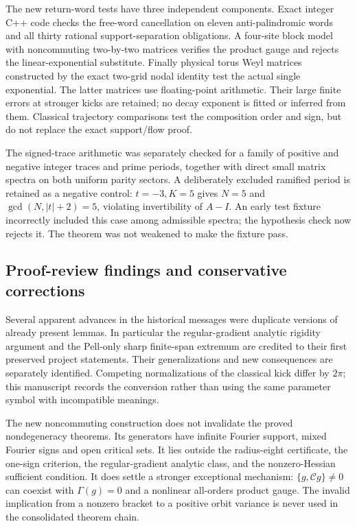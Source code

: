 The new return-word tests have three independent components. Exact integer
C++ code checks the free-word cancellation on eleven anti-palindromic words
and all thirty rational support-separation obligations. A four-site block
model with noncommuting two-by-two matrices verifies the product gauge and
rejects the linear-exponential substitute. Finally physical torus Weyl
matrices constructed by the exact two-grid nodal identity test the actual
single exponential. The latter matrices use floating-point arithmetic.
Their large finite errors at stronger kicks are retained; no decay exponent
is fitted or inferred from them. Classical trajectory comparisons test the
composition order and sign, but do not replace the exact support/flow proof.

The signed-trace arithmetic was separately checked for a family of positive
and negative integer traces and prime periods, together with direct small
matrix spectra on both uniform parity sectors. A deliberately excluded
ramified period is retained as a negative control: $t=-3,K=5$ gives $N=5$
and $\gcd(N,|t|+2)=5$, violating invertibility of $A-I$. An early test
fixture incorrectly included this case among admissible spectra; the
hypothesis check now rejects it. The theorem was not weakened to make the
fixture pass.

\subsection{Proof-review findings and conservative corrections}
Several apparent advances in the historical messages were duplicate versions
of already present lemmas. In particular the regular-gradient analytic
rigidity argument and the Pell-only sharp finite-span extremum are credited
to their first preserved project statements. Their generalizations and new
consequences are separately identified. Competing normalizations of the
classical kick differ by $2\pi$; this manuscript records the conversion
rather than using the same parameter symbol with incompatible meanings.

The new noncommuting construction does not invalidate the proved
nondegeneracy theorems. Its generators have infinite Fourier support,
mixed Fourier signs and open critical sets. It lies outside the radius-eight
certificate, the one-sign criterion, the regular-gradient analytic class,
and the nonzero-Hessian sufficient condition. It does settle a stronger
exceptional mechanism: $\{g,\mathcal Cg\}\ne0$ can coexist with
$\Gamma(g)=0$ and a nonlinear all-orders product gauge. The invalid
implication from a nonzero bracket to a positive orbit variance is never
used in the consolidated theorem chain.

